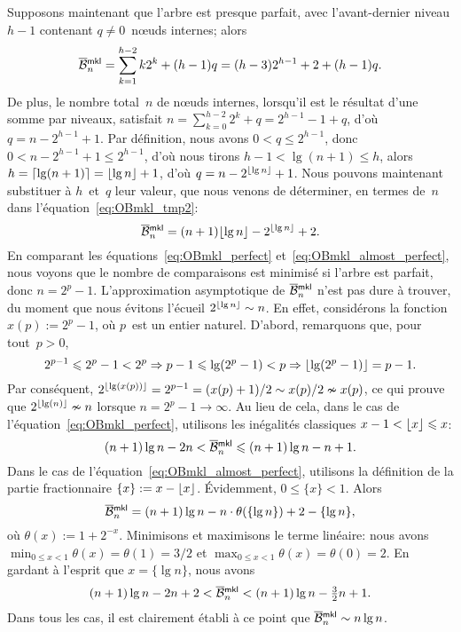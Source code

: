 Supposons maintenant que l'arbre est presque parfait, avec
l'avant-dernier niveau \(h-1\) contenant \(q \neq 0\)~n{\oe}uds
internes; alors
\begin{equation}
\OB{\fun{mkl}}{n} = \sum_{k=1}^{h-2}k2^k + (h-1)q
= (h-3)2^{h-1} + 2 + (h-1)q.
\label{eq:OBmkl_tmp2}
\end{equation}
De plus, le nombre total~\(n\) de n{\oe}uds internes, lorsqu'il est le
résultat d'une somme par niveaux, satisfait \(n = \sum_{k=0}^{h-2}2^k
+ q = 2^{h-1} - 1 + q\), d'où \(q = n - 2^{h-1} + 1\). Par définition,
nous avons \(0 < q \leqslant 2^{h-1}\), donc \(0 < n - 2^{h-1} + 1
\leqslant 2^{h-1}\), d'où nous tirons \(h - 1 < \lg(n+1) \leqslant
h\), alors \(h = \lceil{\lg(n+1)}\rceil = \lfloor{\lg n}\rfloor + 1\), d'où \(q =
n - 2^{\lfloor{\lg n}\rfloor} + 1\). Nous pouvons maintenant substituer à
\(h\)~et~\(q\) leur valeur, que nous venons de déterminer, en termes
de~\(n\) dans l'équation~\eqref{eq:OBmkl_tmp2}:
\begin{equation}
\OB{\fun{mkl}}{n} = (n+1)\floor{\lg n} - 2^{\floor{\lg n}} + 2.
\label{eq:OBmkl_almost_perfect}
\end{equation}
En comparant les équations~\eqref{eq:OBmkl_perfect}
et~\eqref{eq:OBmkl_almost_perfect}, nous voyons que le nombre de
comparaisons est minimisé si l'arbre est parfait, donc \(n = 2^p -
1\). L'approximation asymptotique de \(\OB{\fun{mkl}}{n}\) n'est pas
dure à trouver, du moment que nous évitons l'écueil \(2^{\lfloor{\lg
    n}\rfloor} \sim n\). En effet, considérons la fonction \(x(p) := 2^p -
1\), où \(p\)~est un entier naturel. D'abord, remarquons que, pour
tout~\(p>0\),
\begin{equation*}
2^{p-1} \leqslant 2^p - 1 < 2^p \Rightarrow p-1 \leqslant \lg(2^p-1) <
p \Rightarrow \lfloor{\lg(2^p-1)}\rfloor = p-1.
\end{equation*}
Par conséquent, \(2^{\lfloor{\lg(x(p))}\rfloor} = 2^{p-1} = (x(p)+1)/2 \sim
x(p)/2 \nsim x(p)\), ce qui prouve que \(2^{\lfloor{\lg(n)}\rfloor} \nsim n\)
lorsque \(n=2^p-1 \rightarrow \infty\). Au lieu de cela, dans le cas
de l'équation~\eqref{eq:OBmkl_perfect}, utilisons les inégalités
classiques \(x - 1 < \lfloor{x}\rfloor \leqslant x\):
\begin{equation*}
(n+1)\lg n - 2n < \OB{\fun{mkl}}{n} \leqslant (n+1)\lg n - n + 1.
\end{equation*}
Dans le cas de l'équation~\eqref{eq:OBmkl_almost_perfect}, utilisons
la définition de la partie fractionnaire
\(\{x\} := x - \lfloor{x}\rfloor\). Évidemment, \(0 \leqslant \{x\} <
1\). Alors
\begin{equation*}
\OB{\fun{mkl}}{n} = (n+1)\lg n - n \cdot \theta(\{\lg n\})
                    + 2 - \{\lg n\},
\end{equation*}
où \(\theta(x) := 1 + 2^{-x}\). Minimisons et maximisons le terme
linéaire: nous avons \(\min_{0 \leqslant x < 1}\theta(x) = \theta(1) =
3/2\) et \(\max_{0 \leqslant x < 1}\theta(x) = \theta(0) =
2\). En gardant à l'esprit que \(x=\{\lg n\}\), nous avons
\begin{equation*}
(n+1)\lg n - 2n + 2 < \OB{\fun{mkl}}{n} < (n+1)\lg n - \tfrac{3}{2}n + 1.
\end{equation*}
Dans tous les cas, il est clairement établi à ce point que
\(\OB{\fun{mkl}}{n} \sim n\lg n\).

